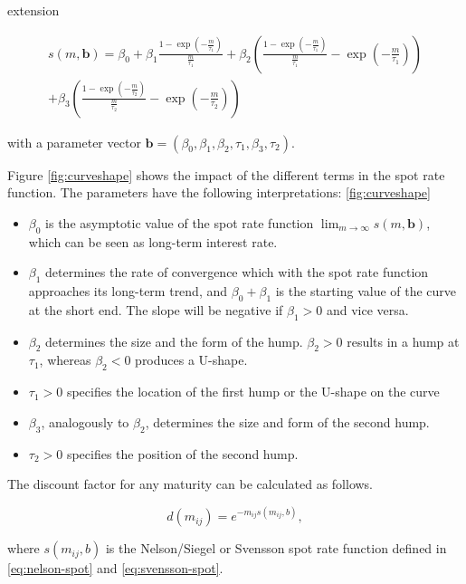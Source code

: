 %
 
\cite{Svensson1994} extension


\begin{multline}\label{eq:svensson-spot}
    s(m,\bm{b}) = \beta_0 + \beta_1\frac{1-\exp(-\frac{m}{\tau_1})}{\frac{m}{\tau_1}} + \beta_2\left(\frac{1-\exp(-\frac{m}{\tau_1})}{\frac{m}{\tau_1}} - \exp(-\frac{m}{\tau_1})\right) \\+ \beta_3\left(\frac{1-\exp(-\frac{m}{\tau_2})}{\frac{m}{\tau_2}} - \exp(-\frac{m}{\tau_2})\right)
\end{multline}



with a parameter vector ${\bm{b}} = \left(\beta_0,\beta_1,\beta_2,\tau_1,\beta_3,\tau_2\right)$.

Figure \ref{fig:curveshape} shows the impact of the different terms in the spot rate function. The parameters have the following interpretations: \ref{fig:curveshape}

\begin{itemize}
\item $\beta_0$ is the asymptotic value of the spot rate function $\lim_{m\to\infty}s(m,\bm{b})$, which can be seen as long-term interest rate.
\item $\beta_1$ determines the rate of convergence which with the spot rate function approaches its long-term trend, and $\beta_0+\beta_1$ is the starting value of the curve at the short end. The slope will be negative if $\beta_1>0$ and vice versa.
\item $\beta_2$ determines the size and the form of the hump. $\beta_2 >0$  results in a hump at  $\tau_1$, whereas $\beta_2<0$ produces a U-shape.
\item $\tau_1>0$ specifies the location of the first hump or the U-shape on the curve
\item $\beta_3$, analogously to $\beta_2$, determines the size and form of the second hump.
\item $\tau_2>0$ specifies the position of the second hump.
\end{itemize}

The discount factor for any maturity can be calculated as follows. 

\begin{displaymath}
d(m_{ij})=e^{-m_{ij}s(m_{ij},b)},
\end{displaymath}

where $s(m_{ij},b)$ is the Nelson/Siegel or Svensson spot rate function defined in \eqref{eq:nelson-spot} and \eqref{eq:svensson-spot}.

